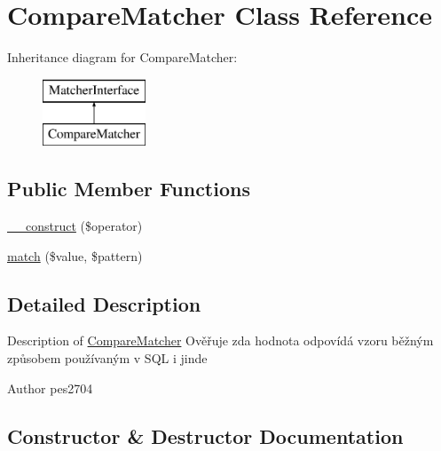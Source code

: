 \hypertarget{class_pes_1_1_query_1_1_matcher_1_1_compare_matcher}{}\section{Compare\+Matcher Class Reference}
\label{class_pes_1_1_query_1_1_matcher_1_1_compare_matcher}
Inheritance diagram for Compare\+Matcher\+:\begin{figure}[H]
\begin{center}
\leavevmode
\includegraphics[height=2.000000cm]{class_pes_1_1_query_1_1_matcher_1_1_compare_matcher}
\end{center}
\end{figure}
\subsection*{Public Member Functions}
\begin{DoxyCompactItemize}
\item 
\mbox{\hyperlink{class_pes_1_1_query_1_1_matcher_1_1_compare_matcher_a67414a467f92d3e285d22552b99708ad}{\+\_\+\+\_\+construct}} (\$operator)
\item 
\mbox{\hyperlink{class_pes_1_1_query_1_1_matcher_1_1_compare_matcher_af38750109828e091458dbb0481a2a0d7}{match}} (\$value, \$pattern)
\end{DoxyCompactItemize}


\subsection{Detailed Description}
Description of \mbox{\hyperlink{class_pes_1_1_query_1_1_matcher_1_1_compare_matcher}{Compare\+Matcher}} Ověřuje zda hodnota odpovídá vzoru běžným způsobem používaným v S\+QL i jinde \begin{DoxyAuthor}{Author}
pes2704 
\end{DoxyAuthor}


\subsection{Constructor \& Destructor Documentation}
\mbox{\label{class_pes_1_1_query_1_1_matcher_1_1_compare_matcher_a67414a467f92d3e285d22552b99708ad}} 
